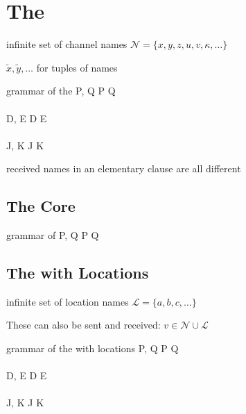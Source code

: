 \section{The \JoinCalc}

infinite set of channel names
$ \mathcal{N} = \{ x, y, z, u, v, \kappa, \ldots \} $

$ \tilde{x}, \tilde{y}, \ldots $ for tuples of names

\begin{JDef}{grammar of the \joincalc}
  P, Q
  \grmr {}
  \altn {}
  \altn P \jpar Q
  \altn \jnullproc
  \\ \\
  D, E
  \grmr {}
  \altn D \jcon E
  \altn \jnulldef
  \\ \\
  J, K
  \grmr {}
  \altn J \jpat K
\end{JDef}

received names in an elementary clause are all different


\subsection{The Core \JoinCalc}

\begin{JDef}{grammar of \monadicjoincalc}
  P, Q
  \grmr {}
  \altn P \jpar Q
  \altn {}
\end{JDef}


\subsection{The \JoinCalc with Locations}

infinite set of location names
$ \mathcal{L} = \{ a, b, c, \ldots \} $

These can also be sent and received:
$ v \in \mathcal{N} \cup \mathcal{L} $


\begin{JDef}{grammar of the \joincalc with locations}
  P, Q
  \grmr {}
  \altn {}
  \altn P \jpar Q
  \altn \jnullproc
  \altn {}
  \\ \\
  D, E
  \grmr {}
  \altn D \jcon E
  \altn \jnulldef
  \altn {}
  \\ \\
  J, K
  \grmr {}
  \altn J \jpat K
\end{JDef}

